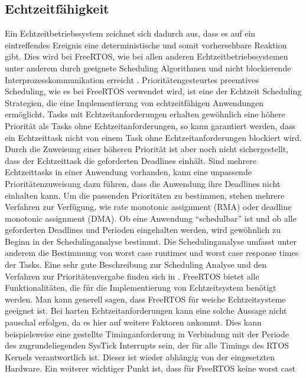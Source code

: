 \subsection{Echtzeitfähigkeit}
Ein Echtzeitbetriebssystem zeichnet sich dadurch aus, dass es auf ein eintreffendes Ereignis eine deterministische und somit vorhersehbare Reaktion gibt. Dies wird bei FreeRTOS, wie bei allen anderen Echtzeitbetriebssystemen unter anderem durch geeignete Scheduling Algorithmen und nicht blockierende Interprozesskommunikation erreicht\cite{9780128015070} \cite{Jones:1997:CRT:269005.266689} \cite{Regehr:2001:ACR:882481.883779}. Prioritätengesteurtes preemtives Scheduling, wie es bei FreeRTOS verwendet wird, ist eine der Echtzeit Scheduling Strategien\cite{9780128015070}, die eine Implementierung von echtzeitfähigen Anwendungen ermöglicht. Tasks mit Echtzeitanforderungen erhalten gewöhnlich eine höhere Priorität als Tasks ohne Echtzeitanforderungen, so kann garantiert werden, dass ein Echtzeittask nicht von einem Task ohne Echtzeitanforderungen blockiert wird. Durch die Zuweisung einer höheren Priorität ist aber noch nicht sichergestellt, dass der Echtzeittask die geforderten Deadlines einhält. Sind mehrere Echtzeittasks in einer Anwendung vorhanden, kann eine unpassende Prioritätenzuweisung dazu führen, dass die Anwendung ihre Deadlines nicht einhalten kann\cite{9780128015070}. Um die passenden Prioritäten zu bestimmen, stehen mehrere Verfahren zur Verfügung, wie rate monotonic assignment (RMA) oder deadline monotonic assignment (DMA). Ob eine Anwendung "`schedulbar"' ist und ob alle geforderten Deadlines und Perioden eingehalten werden, wird gewöhnlich zu Beginn in der Schedulinganalyse bestimmt. Die Schedulinganalyse umfasst unter anderem die Bestimmung von worst case runtimes und worst case response times der Tasks. Eine sehr gute Beschreibung zur Scheduling Analyse und den Verfahren zur Prioritätenvergabe finden sich in \cite{9780128015070}. FreeRTOS bietet alle Funktionalitäten, die für die Implementierung von Echtzeitsystem benötigt werden. Man kann generell sagen, dass FreeRTOS für weiche Echtzeitsysteme geeignet ist. 
Bei harten Echtzeitanforderungen kann eine solche Aussage nicht pauschal erfolgen, da es hier auf weitere Faktoren ankommt. Dies kann beispielsweise eine gestellte Timinganforderung in Verbindung mit der Periode des zugrundeliegenden SysTick Interrupts sein, der für alle Timings des RTOS Kernels verantwortlich ist. Dieser ist wieder abhängig von der eingesetzten Hardware. Ein weiterer wichtiger Punkt ist, dass für FreeRTOS keine worst cast
